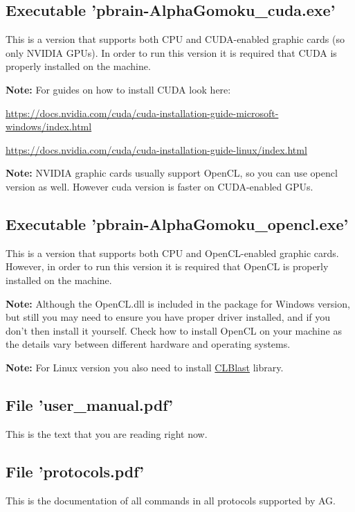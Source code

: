 \documentclass[12pt,a4paper]{article}
\begin{document}
\subsection{Executable 'pbrain-AlphaGomoku{\_}cuda.exe'}
This is a version that supports both CPU and CUDA-enabled graphic cards (so only NVIDIA GPUs). In order to run this version it is required that CUDA is properly installed on the machine.

\textbf{Note:} For guides on how to install CUDA look here:

\href{https://docs.nvidia.com/cuda/cuda-installation-guide-microsoft-windows/index.html}{https://docs.nvidia.com/cuda/cuda-installation-guide-microsoft-windows/index.html}

\href{https://docs.nvidia.com/cuda/cuda-installation-guide-linux/index.html}{https://docs.nvidia.com/cuda/cuda-installation-guide-linux/index.html}

\textbf{Note:} NVIDIA graphic cards usually support OpenCL, so you can use opencl version as well. However cuda version is faster on CUDA-enabled GPUs.

\subsection{Executable 'pbrain-AlphaGomoku{\_}opencl.exe'}
This is a version that supports both CPU and OpenCL-enabled graphic cards. However, in order to run this version it is required that OpenCL is properly installed on the machine.

\textbf{Note:} Although the OpenCL.dll is included in the package for Windows version, but still you may need to ensure you have proper driver installed, and if you don't then install it yourself. Check how to install OpenCL on your machine as the details vary between different hardware and operating systems.

\textbf{Note:} For Linux version you also need to install \href{https://github.com/CNugteren/CLBlast}{CLBlast} library.

\subsection{File 'user{\_}manual.pdf'}
This is the text that you are reading right now.

\subsection{File 'protocols.pdf'}
This is the documentation of all commands in all protocols supported by AG.
\end{document}
